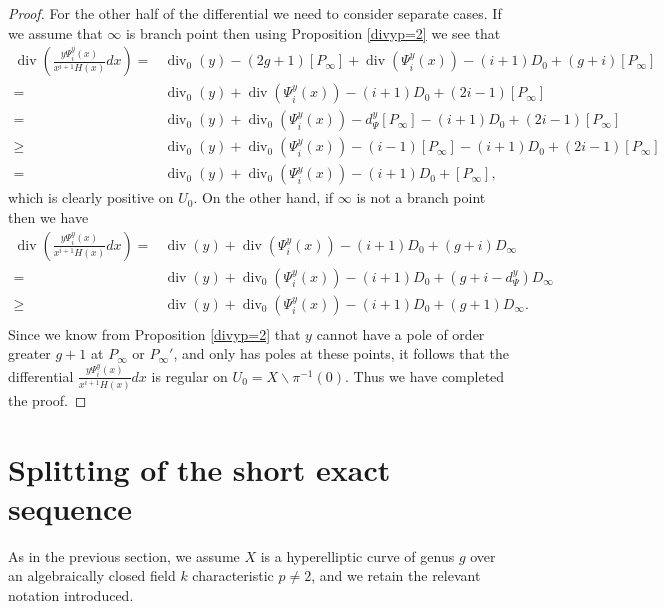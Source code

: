 \documentclass[draft, 11pt]{article} %
\theoremstyle{plain}
\theoremstyle{remark}
\DeclareMathOperator{\di}{div}
\begin{document}
\begin{proof}
For the other half of the differential we need to consider separate cases.
If we assume that $\infty$ is branch point then  using Proposition \ref{divyp=2} we see that
\begin{align*}
\di\left(\frac{y\Psi_i^y(x) }{x^{i+1}H(x)}dx \right)  =  & \di_0(y) - (2g+1)[P_\infty] + \di(\Psi_i^y(x)) - (i+1)D_0 + (g+i)[P_\infty] \\
 =  & \di_0(y) + \di(\Psi_i^y(x)) -(i+1)D_0 + (2i -1)[P_\infty] \\
 = &  \di_0(y) + \di_0(\Psi_i^y(x)) - d_\Psi^y[P_\infty] - (i+1)D_0 + (2i-1)[P_\infty] \\
 \geq &  \di_0(y) + \di_0(\Psi_i^y(x)) -(i-1)[P_\infty] -(i+1)D_0 + (2i-1)[P_\infty] \\
 =   &\di_0(y) + \di_0(\Psi_i^y(x)) -(i+1)D_0 + [P_\infty],
\end{align*}
which is clearly positive on $U_0$.
On the other hand, if $\infty$ is not a branch point then we have
\begin{align*}
\di\left(\frac{y\Psi_i^y(x) }{x^{i+1}H(x)}dx \right)  =  & \di(y) + \di(\Psi_i^y(x)) - (i+1)D_0 + (g+i)D_\infty \\
= & \di(y) + \di_0(\Psi_i^y(x)) - (i+1)D_0 + (g+i - d_\Psi^y)D_\infty \\
\geq & \di(y) + \di_0(\Psi_i^y(x)) - (i+1)D_0 + (g+1)D_\infty. \\
\end{align*}
Since we know from Proposition \ref{divyp=2} that $y$ cannot have a pole of order greater $g+1$ at $P_\infty$ or $P_\infty'$, and only has poles at these points, it follows that the differential $\frac{y\Psi_i^y(x) }{x^{i+1}H(x)}dx$ is regular on $U_0 = X \backslash \pi^{-1}(0)$.
Thus we have completed the proof.


\end{proof}



\section{Splitting of the short exact sequence}


As in the previous section, we assume $X$ is a hyperelliptic curve of genus $g$ over an algebraically closed field $k$ characteristic $p \neq 2$, and we retain the relevant notation introduced.
\end{document}
